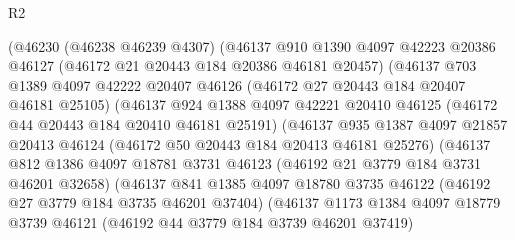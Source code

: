 \begin{lexlean}{R2}
\begin{coremodule}
                        (@46230
                          (@46238 @46239 @4307)
                          (@46137
                            @910
                            @1390
                            @4097
                            @42223
                            @20386
                            @46127
                            (@46172 @21 @20443 @184 @20386 @46181 @20457)
                            (@46137
                              @703
                              @1389
                              @4097
                              @42222
                              @20407
                              @46126
                              (@46172 @27 @20443 @184 @20407 @46181 @25105)
                              (@46137
                                @924
                                @1388
                                @4097
                                @42221
                                @20410
                                @46125
                                (@46172 @44 @20443 @184 @20410 @46181 @25191)
                                (@46137
                                  @935
                                  @1387
                                  @4097
                                  @21857
                                  @20413
                                  @46124
                                  (@46172 @50 @20443 @184 @20413 @46181 @25276)
                                  (@46137
                                    @812
                                    @1386
                                    @4097
                                    @18781
                                    @3731
                                    @46123
                                    (@46192 @21 @3779 @184 @3731 @46201 @32658)
                                    (@46137
                                      @841
                                      @1385
                                      @4097
                                      @18780
                                      @3735
                                      @46122
                                      (@46192 @27 @3779 @184 @3735 @46201 @37404)
                                      (@46137
                                        @1173
                                        @1384
                                        @4097
                                        @18779
                                        @3739
                                        @46121
                                        (@46192 @44 @3779 @184 @3739 @46201 @37419)

\end{coremodule}
\end{lexlean}
